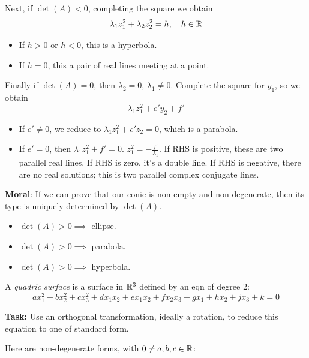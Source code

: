 \documentclass[10pt]{scrartcl}
\begin{document}
Next, if $\det(A) < 0$, completing the square we obtain
\[
    \lambda_1z_1^2 + \lambda_2z_2^2 = h,\quad h \in\mathbb{R}
\]
\begin{itemize}
\item  If $h > 0$ or $h< 0$, this is a hyperbola. 
\item If $h = 0$, this a pair of real lines meeting at a point. 
\end{itemize}\vsp

Finally if $\det(A) = 0$, then $\lambda_2 = 0$, $\lambda_1 \neq 0$. Complete the square for $y_1$, so we obtain
\[
  \lambda_1z_1^2 + e'y_2 + f'
\]
\begin{itemize}
\item  If $e' \neq 0$, we reduce to $\lambda_1z_1^2 + e'z_2 = 0$, which is a parabola.
\item If $e' = 0$, then $\lambda_1z_1^2 + f' = 0$. $z_1^2 = -\frac{f'}{\lambda_1}$. If RHS is positive, these are two parallel real lines. If RHS is zero, it's a double line. If RHS is negative, there are no real solutions; this is two parallel complex conjugate lines. 
\end{itemize}\vsp

\textbf{Moral}: If we can prove that our conic is non-empty and non-degenerate, then its type is uniquely determined by $\det(A)$. 
 \begin{itemize}
\item   $\det(A) > 0 \implies$ ellipse. 
\item  $\det(A) > 0 \implies$ parabola. 
\item  $\det(A) > 0 \implies$ hyperbola.
  \end{itemize}








 



\vsp
 
\begin{definition}
A \emph{quadric surface} is  a surface in $\mathbb{R}^3$ defined by an eqn of degree $2$: 
\[
  ax_1^2 + bx_2^2 + cx_3^2 + dx_1x_2 + ex_1x_2 + fx_2x_3 + gx_1 + hx_2 + jx_3 + k = 0
\]
\end{definition}

\textbf{Task:} Use an orthogonal transformation, ideally a rotation, to reduce this equation to one of standard form.

Here are non-degenerate forms, with $0 \neq a,b,c\in\mathbb{R}$:
\end{document}
